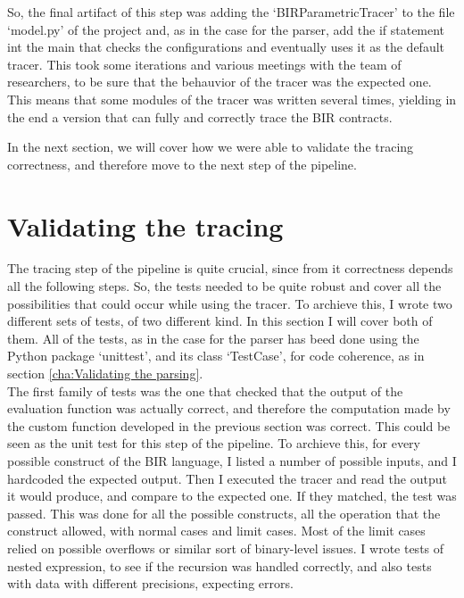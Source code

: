 So, the final artifact of this step was adding the `BIRParametricTracer' to the file
`model.py' of the project and, as in the case for the parser, add the if statement
int the main that checks the configurations and eventually uses it as the default
tracer. This took some iterations and various meetings with the team of
researchers, to be sure that the behauvior of the tracer was the expected one.
This means that some modules of the tracer was written several times, yielding in
the end a version that can fully and correctly trace the BIR contracts.

In the next section, we will cover how we were able to validate the tracing
correctness, and therefore move to the next step of the pipeline.

\section{Validating the tracing}
\label{cha:Validating the tracing} The tracing step of the pipeline is quite crucial,
since from it correctness depends all the following steps. So, the tests needed
to be quite robust and cover all the possibilities that could occur while using
the tracer. To archieve this, I wrote two different sets of tests, of two different
kind. In this section I will cover both of them. All of the tests, as in the
case for the parser has beed done using the Python package `unittest', and its class
`TestCase', for code coherence, as in section \ref{cha:Validating the parsing}.
\\

The first family of tests was the one that checked that the output of the evaluation
function was actually correct, and therefore the computation made by the custom
function developed in the previous section was correct. This could be seen as the
unit test for this step of the pipeline. To archieve this, for every possible construct
of the BIR language, I listed a number of possible inputs, and I hardcoded the expected
output. Then I executed the tracer and read the output it would produce, and compare
to the expected one. If they matched, the test was passed. This was done for all
the possible constructs, all the operation that the construct allowed, with
normal cases and limit cases. Most of the limit cases relied on possible overflows
or similar sort of binary-level issues. I wrote tests of nested expression, to see
if the recursion was handled correctly, and also tests with data with different
precisions, expecting errors.

